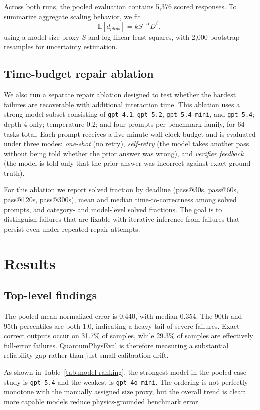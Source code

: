 \documentclass[11pt]{article}
\begin{document}
Across both runs, the pooled evaluation contains 5{,}376 scored responses. To summarize aggregate scaling behavior, we fit
\[
\mathbb{E}[d_{phys}] = k S^{-\alpha} D^{\beta},
\]
using a model-size proxy $S$ and log-linear least squares, with 2{,}000 bootstrap resamples for uncertainty estimation.

\subsection{Time-budget repair ablation}
We also run a separate repair ablation designed to test whether the hardest failures are recoverable with additional interaction time. This ablation uses a strong-model subset consisting of \texttt{gpt-4.1}, \texttt{gpt-5.2}, \texttt{gpt-5.4-mini}, and \texttt{gpt-5.4}; depth 4 only; temperature 0.2; and four prompts per benchmark family, for 64 tasks total. Each prompt receives a five-minute wall-clock budget and is evaluated under three modes: \emph{one-shot} (no retry), \emph{self-retry} (the model takes another pass without being told whether the prior answer was wrong), and \emph{verifier feedback} (the model is told only that the prior answer was incorrect against exact ground truth).

For this ablation we report solved fraction by deadline (pass@30s, pass@60s, pass@120s, pass@300s), mean and median time-to-correctness among solved prompts, and category- and model-level solved fractions. The goal is to distinguish failures that are fixable with iterative inference from failures that persist even under repeated repair attempts.

\section{Results}
\subsection{Top-level findings}
The pooled mean normalized error is 0.440, with median 0.354. The 90th and 95th percentiles are both 1.0, indicating a heavy tail of severe failures. Exact-correct outputs occur on 31.7\% of samples, while 29.3\% of samples are effectively full-error failures. QuantumPhysEval is therefore measuring a substantial reliability gap rather than just small calibration drift.

As shown in Table~\ref{tab:model-ranking}, the strongest model in the pooled case study is \texttt{gpt-5.4} and the weakest is \texttt{gpt-4o-mini}. The ordering is not perfectly monotone with the manually assigned size proxy, but the overall trend is clear: more capable models reduce physics-grounded benchmark error.
\end{document}
